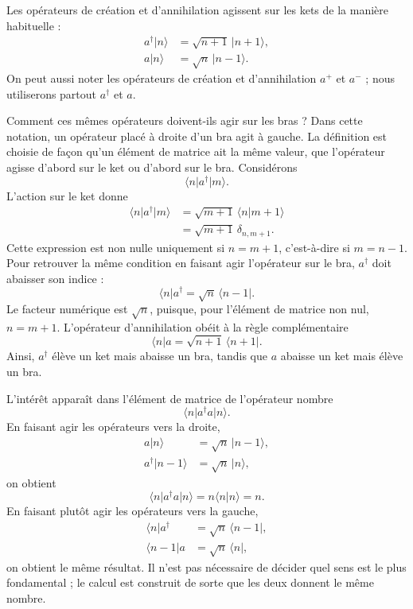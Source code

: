 Les opérateurs de création et d’annihilation agissent sur les kets de la manière habituelle :
\begin{align}
a^\dagger\lvert n\rangle&=\sqrt{n+1}\,\lvert n+1\rangle,\\
a\lvert n\rangle&=\sqrt n\,\lvert n-1\rangle.
\end{align}
On peut aussi noter les opérateurs de création et d’annihilation \(a^+\) et \(a^-\) ; nous utiliserons partout \(a^\dagger\) et \(a\).

Comment ces mêmes opérateurs doivent-ils agir sur les bras ? Dans cette notation, un opérateur placé à droite d’un bra agit à gauche. La définition est choisie de façon qu’un élément de matrice ait la même valeur, que l’opérateur agisse d’abord sur le ket ou d’abord sur le bra. Considérons
\begin{equation}
\langle n\rvert a^\dagger\lvert m\rangle.
\end{equation}
L’action sur le ket donne
\begin{align}
\langle n\rvert a^\dagger\lvert m\rangle
&=\sqrt{m+1}\,\langle n\vert m+1\rangle\\
&=\sqrt{m+1}\,\delta_{n,m+1}.
\end{align}
Cette expression est non nulle uniquement si \(n=m+1\), c’est-à-dire si \(m=n-1\). Pour retrouver la même condition en faisant agir l’opérateur sur le bra, \(a^\dagger\) doit abaisser son indice :
\begin{equation}
\langle n\rvert a^\dagger
=\sqrt n\,\langle n-1\rvert.
\end{equation}
Le facteur numérique est \(\sqrt n\), puisque, pour l’élément de matrice non nul, \(n=m+1\). L’opérateur d’annihilation obéit à la règle complémentaire
\begin{equation}
\langle n\rvert a
=\sqrt{n+1}\,\langle n+1\rvert.
\end{equation}
Ainsi, \(a^\dagger\) élève un ket mais abaisse un bra, tandis que \(a\) abaisse un ket mais élève un bra.

L’intérêt apparaît dans l’élément de matrice de l’opérateur nombre
\begin{equation}
\langle n\rvert a^\dagger a\lvert n\rangle.
\end{equation}
En faisant agir les opérateurs vers la droite,
\begin{align}
a\lvert n\rangle&=\sqrt n\,\lvert n-1\rangle,\\
a^\dagger\lvert n-1\rangle&=\sqrt n\,\lvert n\rangle,
\end{align}
on obtient
\begin{equation}
\langle n\rvert a^\dagger a\lvert n\rangle
=n\langle n\vert n\rangle=n.
\end{equation}
En faisant plutôt agir les opérateurs vers la gauche,
\begin{align}
\langle n\rvert a^\dagger&=\sqrt n\,\langle n-1\rvert,\\
\langle n-1\rvert a&=\sqrt n\,\langle n\rvert,
\end{align}
on obtient le même résultat. Il n’est pas nécessaire de décider quel sens est le plus fondamental ; le calcul est construit de sorte que les deux donnent le même nombre.

